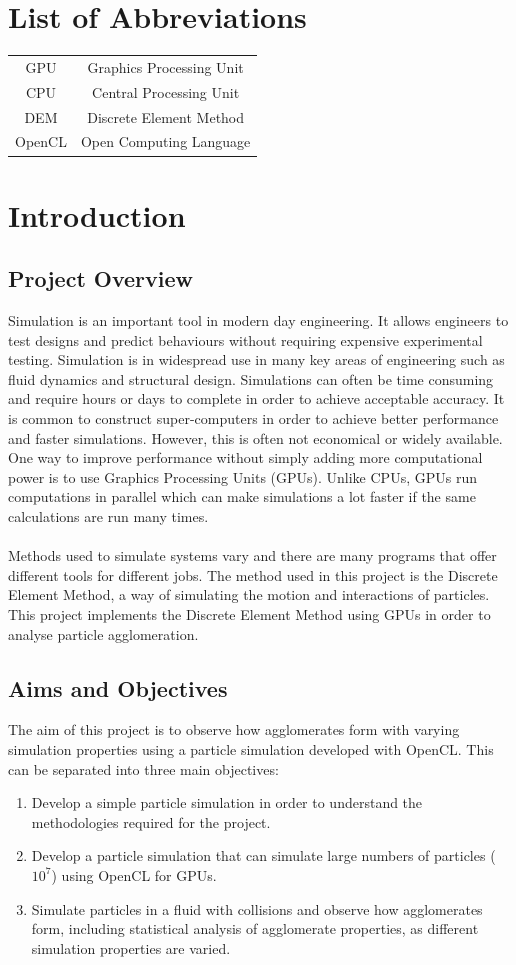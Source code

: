 \documentclass[a4paper,11pt,titlepage]{report}
\begin{document}
\printnomenclature
\chapter*{List of Abbreviations}
\begin{tabular}{c c}
GPU & Graphics Processing Unit \\
CPU & Central Processing Unit \\
DEM & Discrete Element Method \\
OpenCL & Open Computing Language \\
\end{tabular}
\chapter{Introduction}
\section{Project Overview}
Simulation is an important tool in modern day engineering. It allows engineers to test designs and predict
behaviours without requiring expensive experimental testing. Simulation is in widespread use in many key
areas of engineering such as fluid dynamics and structural design. Simulations can often be time consuming and require hours or days to complete in order to achieve acceptable accuracy. It is common to construct super-computers in order to achieve better performance and faster simulations. However, this is often not economical or widely available. One way to improve performance without simply adding more computational power is to use Graphics Processing Units (GPUs). Unlike CPUs, GPUs run computations in parallel which can make simulations a lot faster if the same calculations are run many times.
\\\\Methods used to simulate systems vary and there are many programs that offer different tools for different jobs. The method used in this project is the Discrete Element Method, a way of simulating the motion and interactions of particles. This project implements the Discrete Element Method using GPUs in order to analyse particle agglomeration.
\section{Aims and Objectives}
\label{sec:aims and objectives}
The aim of this project is to observe how agglomerates form with varying simulation properties using a particle simulation developed with OpenCL. This can be separated into three main objectives:
\begin{enumerate}
\item Develop a simple particle simulation in order to understand the methodologies required for the project.
\item Develop a particle simulation that can simulate large numbers of particles ($10^7$) using OpenCL for GPUs.
\item Simulate particles in a fluid with collisions and observe how agglomerates form, including statistical analysis of agglomerate properties, as different simulation properties are varied.
\end{enumerate}
\end{document}
